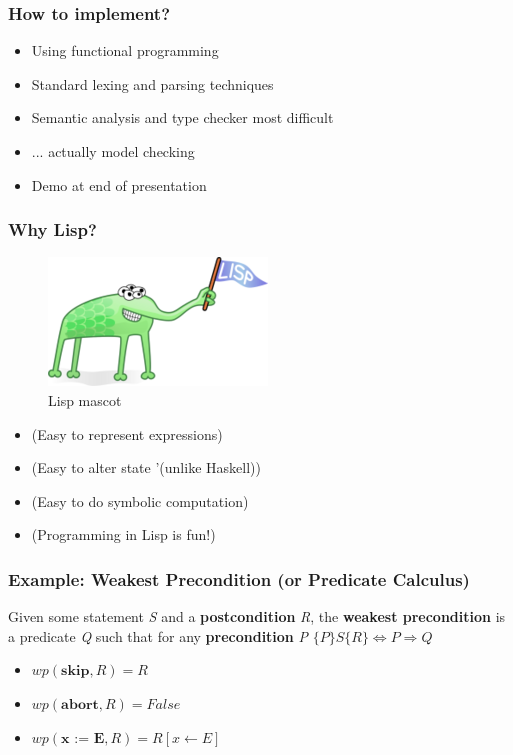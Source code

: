 \documentclass{beamer}
\begin{document}
\begin{frame}
  \frametitle{How to implement?}
  \begin{itemize}
  \item Using functional programming
  \item Standard lexing and parsing techniques
  \item Semantic analysis and type checker most difficult
  \item ... actually model checking
  \item Demo at end of presentation
  \end{itemize}
\end{frame}

\begin{frame}
  \frametitle{Why Lisp?}
  \begin{figure}
    \centering
    \includegraphics[scale=0.45]{lisp.png}
    \caption{Lisp mascot}
    \label{fig:enter-label}
  \end{figure}
  
  \begin{itemize}
  \item (Easy to represent expressions)
  \item (Easy to alter state '(unlike Haskell))
  \item (Easy to do symbolic computation)
  \item (Programming in Lisp is fun!)
  \end{itemize}
\end{frame}

\begin{frame}
  \frametitle{Example: Weakest Precondition (or Predicate Calculus)}
  Given some statement \textit{S} and a \textbf{postcondition} \textit{R},
  the \textbf{weakest precondition} is a predicate \textit{Q} such that for
  any \textbf{precondition} \textit{P} \( \{P\} S \{R\} \Longleftrightarrow P \Rightarrow Q \)
  \begin{itemize}
  \item \(wp(\textbf{skip}, R) = R\)
  \item \(wp(\textbf{abort}, R) = False\)
  \item \(wp(\textbf{x := E}, R) = R[x \leftarrow E] \)    
  \end{itemize}
\end{frame}

\end{document}
